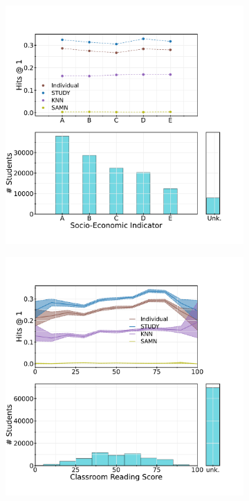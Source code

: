 \documentclass{article}
\begin{document}
\begin{figure}[]
    \centering
    \begin{subfigure}{0.4\linewidth}
        \includegraphics[width=\linewidth]{figures/socio_economic.pdf}
        \caption{}
    \end{subfigure}
    \begin{subfigure}{0.4\linewidth}
        \includegraphics[width=\linewidth]{figures/reading_score.pdf}

\end{subfigure}
\end{figure}
\end{document}

